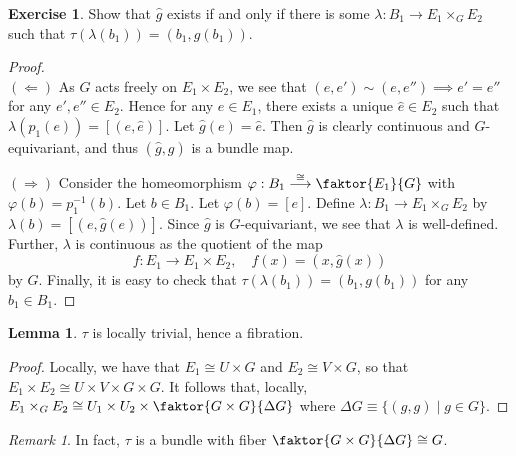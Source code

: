 \documentclass[10pt,letterpaper,cm]{nupset}
\theoremstyle{definition}
\theoremstyle{theorem}
\newtheorem{lemma}[defn]{Lemma}
\newtheorem{exercise}[defn]{Exercise}
\theoremstyle{remark}
\newtheorem{remark}[defn]{Remark}
\newcommand{\1}{\mathbb{1}}
\newcommand{\0}{\vec 0}
\begin{document}
\begin{exercise}
Show that $\hat{g}$ exists if and only if there is some $\lambda : B_1 \to E_1 \times_G E_2$ such that $\tau\left(\lambda\left(b_1\right)\right) = \left(b_1, g(b_1)\right)$.
\end{exercise}
\begin{proof} $ $ \\
$\left(\Longleftarrow\right)$ As $G$ acts freely on $E_1 \times E_2$, we see that $\left(e, e' \right) \sim \left(e, e''\right) \implies e'=e''$ for any $e', e'' \in E_2$. Hence for any $e \in E_1$, there exists a unique $\hat{e} \in E_2$ such that $\lambda\left(p_1(e)\right) = \left[\left(e, \hat{e}\right) \right]$. Let $\hat{g}(e) = \hat{e}$. Then $\hat{g}$  is clearly continuous and $G$-equivariant, and thus $\left(\hat{g}, g\right)$ is a bundle map.

\medskip

$\left(\Longrightarrow\right)$ Consider the homeomorphism $\varphi : B_1 \overset{\cong}{\longrightarrow} \faktor{E_1}{G}$ with $\varphi(b) = p_1^{-1}(b)$. Let $b\in B_1$. Let $\varphi(b) = \left[e\right]$. Define $\lambda : B_1 \to E_1 \times_G E_2$ by $\lambda(b) = \left[\left(e, \hat{g}(e)\right)\right]$. Since $\hat{g}$ is $G$-equivariant, we see that $\lambda$ is well-defined. Further, $\lambda$ is continuous as the quotient of the map 
\[ f : E_1 \to E_1 \times E_2, \quad f(x) = \left(x, \hat{g}(x)\right)
\] by $G$.  Finally, it is easy to check that $\tau\left(\lambda\left(b_1\right)\right) = \left(b_1, g(b_1)\right)$ for any $b_1 \in B_1$.
\end{proof}


\begin{lemma}\label{ttriv}
$\tau$ is locally trivial, hence a fibration.
\end{lemma}
\begin{proof}
Locally, we have that $E_1 \cong U \times G$ and $E_2 \cong V \times G$, so that $E_1 \times E_2 \cong U \times V \times G \times G$. It follows that, locally, $E_1\times_G E_2 \cong U_1  \times U_2 \times \faktor{G\times G}{\Delta{G}}$ where $\Delta{G} \equiv \{\left(g, g\right) \mid g\in G\}$.
\end{proof}

\begin{remark}
In fact, $\tau$ is a bundle with fiber $\faktor{G\times G}{\Delta{G}} \cong G$. 
\end{remark}
\end{document}
